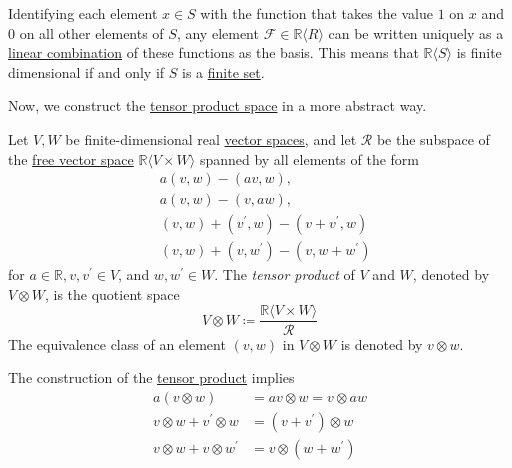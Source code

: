 \documentclass{article}
\newcounter{theorem}[section]
\newcounter{definition}[section]
\begin{document}
    Identifying each element $x \in S$ with the function that takes the value $1$ on $x$ and $0$ on all other elements of $S$, any element $\mathcal{F} \in \mathbb{R} \langle R \rangle$ can be written uniquely as a \hyperref[lin-def:linear-combination]{linear combination} of these functions as the basis. This means that $\mathbb{R} \langle S \rangle$ is finite dimensional if and only if $S$ is a \hyperref[st-def:finite-set]{finite set}. 

    Now, we construct the \hyperref[lin-def:tensor]{tensor product space} in a more abstract way. 
    \begin{definition}
      \label{def:tensor-product}
    Let $V, W$ be finite-dimensional real \hyperref[lin-def:vector-space]{vector spaces}, and let $\mathcal{R}$ be the subspace of the \hyperref[lin-def:free-vector-space]{free vector space} $\mathbb{R} \langle V \times W \rangle$ spanned by all elements of the form 
    \begin{align*}
        &a (v, w) - (a v, w), \\
        &a (v, w) - (v, a w), \\
        &(v, w) + (v^\prime, w) - (v + v^\prime, w) \\
        &(v, w) + (v, w^\prime) - (v, w + w^\prime) 
    \end{align*}
    for $a \in \mathbb{R}, v, v^\prime \in V$, and $w, w^\prime \in W$. The \textit{tensor product} of $V$ and $W$, denoted by $V \otimes W$, is the quotient space 
    \begin{equation}
      V \otimes W \coloneqq \frac{\mathbb{R} \langle V \times W \rangle}{\mathcal{R}}
    \end{equation}
    The equivalence class of an element $(v, w)$ in $V \otimes W$ is denoted by $v \otimes w$. 
    \end{definition}

    \begin{theorem}
      \label{thm:bilinearity-of-the-tensor-product}
    The construction of the \hyperref[def:tensor-product]{tensor product} implies 
    \begin{align*}
        a (v \otimes w) & = av \otimes w = v \otimes a w \\
        v \otimes w + v^\prime \otimes w & = (v + v^\prime) \otimes w \\
        v \otimes w + v \otimes w^\prime & = v \otimes (w + w^\prime) 
    \end{align*}
    \end{theorem}
\end{document}
